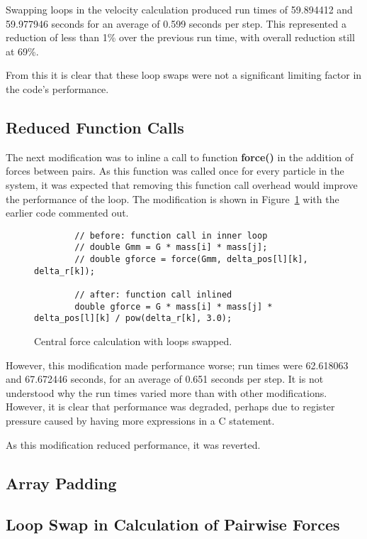 \documentclass[11pt, oneside]{article}   %
\begin{document}
Swapping loops in the velocity calculation produced run times of 59.894412 and 59.977946 seconds for an average of 0.599 seconds per step.
This represented a reduction of less than 1\% over the previous run time, with overall reduction still at 69\%.

From this it is clear that these loop swaps were not a significant limiting factor in the code's performance.

\subsection{Reduced Function Calls}
The next modification was to inline a call to function \textbf{force()} in the addition of forces between pairs.
As this function was called once for every particle in the system, it was expected that removing this function call overhead would improve the performance of the loop.
The modification is shown in Figure~\ref{figure:CallMod} with the earlier code commented out.

\begin{figure}
	\begin{lstlisting}
		// before: function call in inner loop
		// double Gmm = G * mass[i] * mass[j];
		// double gforce = force(Gmm, delta_pos[l][k], delta_r[k]);

		// after: function call inlined
		double gforce = G * mass[i] * mass[j] * delta_pos[l][k] / pow(delta_r[k], 3.0);
	\end{lstlisting}
	\caption{Central force calculation with loops swapped.}
	\label{figure:CallMod}
\end{figure}

However, this modification made performance worse; run times were 62.618063 and 67.672446 seconds, for an average of 0.651 seconds per step.
It is not understood why the run times varied more than with other modifications.
However, it is clear that performance was degraded, perhaps due to register pressure caused by having more expressions in a C statement.

As this modification reduced performance, it was reverted.

\subsection{Array Padding}


\subsection{Loop Swap in Calculation of Pairwise Forces}
\end{document}

